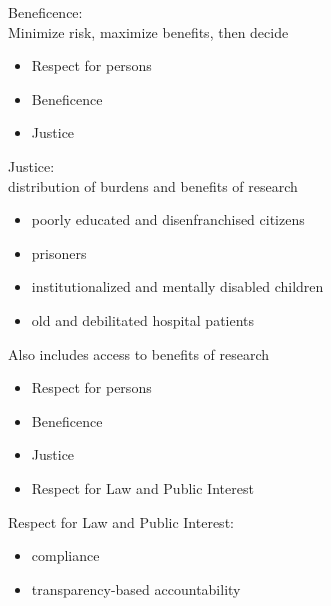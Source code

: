 \documentclass{beamer}
\begin{document}
\begin{frame}

Beneficence:\\
Minimize risk, maximize benefits, then decide

\end{frame}
\begin{frame}

\begin{itemize}
\item Respect for persons
\item Beneficence
\item Justice
\end{itemize}

\end{frame}
\begin{frame}

Justice:\\
distribution of burdens and benefits of research
\pause
\begin{itemize}
\item poorly educated and disenfranchised citizens
\item prisoners
\item institutionalized and mentally disabled children
\item old and debilitated hospital patients
\end{itemize}
\pause
Also includes access to benefits of research

\end{frame}
\begin{frame}

\begin{itemize}
\item Respect for persons
\item Beneficence
\item Justice
\item Respect for Law and Public Interest
\end{itemize}

\end{frame}
\begin{frame}

Respect for Law and Public Interest:\\
\begin{itemize}
\item compliance
\item transparency-based accountability
\end{itemize}

\end{frame}
\end{document}
